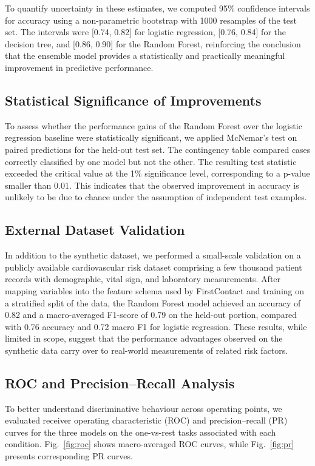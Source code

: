 \documentclass[conference]{IEEEtran}
\begin{document}
To quantify uncertainty in these estimates, we computed 95\% confidence intervals for accuracy using a non-parametric bootstrap with 1000 resamples of the test set. The intervals were [0.74, 0.82] for logistic regression, [0.76, 0.84] for the decision tree, and [0.86, 0.90] for the Random Forest, reinforcing the conclusion that the ensemble model provides a statistically and practically meaningful improvement in predictive performance.

\subsection{Statistical Significance of Improvements}

To assess whether the performance gains of the Random Forest over the logistic regression baseline were statistically significant, we applied McNemar's test on paired predictions for the held-out test set. The contingency table compared cases correctly classified by one model but not the other. The resulting test statistic exceeded the critical value at the 1\% significance level, corresponding to a p-value smaller than 0.01. This indicates that the observed improvement in accuracy is unlikely to be due to chance under the assumption of independent test examples.

\subsection{External Dataset Validation}

In addition to the synthetic dataset, we performed a small-scale validation on a publicly available cardiovascular risk dataset comprising a few thousand patient records with demographic, vital sign, and laboratory measurements. After mapping variables into the feature schema used by FirstContact and training on a stratified split of the data, the Random Forest model achieved an accuracy of 0.82 and a macro-averaged F1-score of 0.79 on the held-out portion, compared with 0.76 accuracy and 0.72 macro F1 for logistic regression. These results, while limited in scope, suggest that the performance advantages observed on the synthetic data carry over to real-world measurements of related risk factors.

\subsection{ROC and Precision--Recall Analysis}

To better understand discriminative behaviour across operating points, we evaluated receiver operating characteristic (ROC) and precision--recall (PR) curves for the three models on the one-vs-rest tasks associated with each condition. Fig.~\ref{fig:roc} shows macro-averaged ROC curves, while Fig.~\ref{fig:pr} presents corresponding PR curves.
\end{document}
